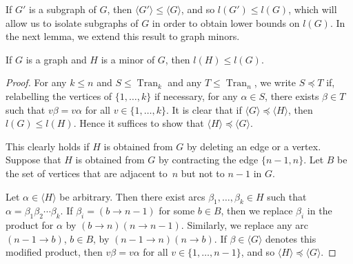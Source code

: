 \documentclass[ALCO,ThmDefs,Unicode,epreuves]{cedram}
\DeclareMathOperator{\Tran}{Tran}
\newcommand{\genset}[1]{\langle#1\rangle}
\begin{document}
If $G'$ is a subgraph of $G$, then $\genset{G'}\leq\genset{G}$, and so $l(G')
\le l(G)$, which will allow us to isolate subgraphs of $G$ in order to obtain
lower bounds on $l(G)$. In the next lemma, we extend this result to graph minors.

\begin{lemma} \label{cor:l_minor}
 If $G$ is a graph and $H$ is a minor of $G$, then $l(H) \le l(G)$.
\end{lemma}
\begin{proof}
 For any $k \le n$ and $S \le \Tran_k$ and any $T \le \Tran_n$, we write $S
 \preceq T$ if, relabelling the vertices of $\{1, \ldots, k\}$ if necessary,
 for any $\alpha \in S$, there exists $\beta \in T$ such that $v \beta = v
 \alpha$ for all $v \in \{1, \ldots, k\}$. It is clear that if $\genset{G}
 \preceq \genset{H}$, then $l(G) \leq l(H)$. Hence it suffices to show that
 $\genset{H} \preceq \genset{G}$. 

 This clearly holds if $H$ is obtained from $G$ by deleting an edge or a
 vertex. Suppose that $H$ is obtained from $G$ by contracting the edge $\{n-1,
 n\}$. Let $B$ be the set of vertices that are adjacent to~$n$ but not to
 $n-1$ in $G$. 

 Let $\alpha \in \genset{H}$ be arbitrary. Then there exist arcs $\beta_1,
 \ldots, \beta_k \in H$ such that $\alpha = \beta_1 \beta_2 \cdots \beta_k$.
 If $\beta_i = (b \to n-1)$ for some $b\in B$, then we replace $\beta_i$ in
 the product for $\alpha$ by $(b \to n)(n \to n-1)$. Similarly, we replace any
 arc $(n-1 \to b)$, $b\in B$, by $(n-1 \to n)(n \to b)$. If $\beta \in
 \genset{G}$ denotes this modified product, then $v \beta = v \alpha$ for all
 $v \in \{1, \ldots, n -1\}$, and so $\genset{H}\preceq \genset{G}$. 
\end{proof}
\end{document}
